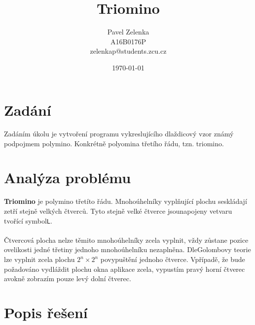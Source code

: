 \documentclass[12pt]{scrartcl}
\author{Pavel Zelenka\\A16B0176P\\zelenkap@students.zcu.cz}
\date{\today}
\title{Triomino}
\begin{document}
\maketitle
{}
\newpage
{}
\newpage
\section{Zadání}
	
\paragraph{}
Zadáním úkolu je vytvoření programu vykreslujícího dlaždicový vzor známý pod\nobreakspace pojmem polymino. Konkrétně polyomina třetího řádu, tzn. triomino.

\section{Analýza problému}

\paragraph{}
\textbf{Triomino} je polymino třetíto řádu. Mnohoúhelníky vyplňující plochu se\nobreakspace skládají ze\nobreakspace tří stejně velkých čtverců. Tyto stejně velké čtverce jsou\nobreakspace napojeny ve\nobreakspace tvaru tvořící symbol\nobreakspace \texttt{L}.

\paragraph{}
Čtvercová plocha nelze těmito mnohoúhelníky zcela vyplnit, vždy zůstane pozice o\nobreakspace velikosti jedné třetiny jednoho mnohoúhelníku nezaplněna. Dle\nobreakspace Golombovy teorie lze vyplnit zcela plochu $2^n \times 2^n$ po\nobreakspace vypuštění jednoho čtverce. V\nobreakspace případě, že bude požadováno vydláždit plochu okna aplikace zcela, vypustím pravý horní čtverec a\nobreakspace v\nobreakspace okně zobrazím pouze levý dolní čtverec.

\section{Popis řešení}
\end{document}
